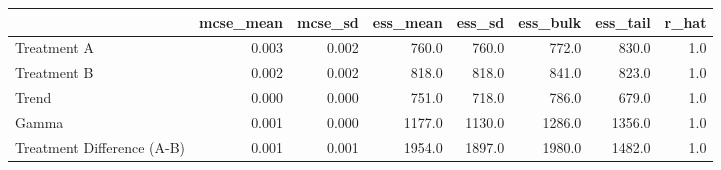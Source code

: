 \begin{tabular}{lrrrrrrr}
\toprule
{} &  mcse\_mean &  mcse\_sd &  ess\_mean &  ess\_sd &  ess\_bulk &  ess\_tail &  r\_hat \\
\midrule
Treatment A                &      0.003 &    0.002 &     760.0 &   760.0 &     772.0 &     830.0 &    1.0 \\
Treatment B                &      0.002 &    0.002 &     818.0 &   818.0 &     841.0 &     823.0 &    1.0 \\
Trend                      &      0.000 &    0.000 &     751.0 &   718.0 &     786.0 &     679.0 &    1.0 \\
Gamma                      &      0.001 &    0.000 &    1177.0 &  1130.0 &    1286.0 &    1356.0 &    1.0 \\
Treatment Difference (A-B) &      0.001 &    0.001 &    1954.0 &  1897.0 &    1980.0 &    1482.0 &    1.0 \\
\bottomrule
\end{tabular}
